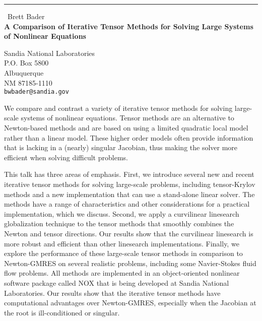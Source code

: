 \documentclass{report}
\begin{document}
\begin{center}
\rule{6in}{1pt} \
{\large Brett Bader \\
{\bf A Comparison of Iterative Tensor Methods for Solving Large Systems of Nonlinear Equations}}

Sandia National Laboratories \\ P.O. Box 5800 \\ Albuquerque \\ NM  87185-1110
\\
{\tt bwbader@sandia.gov}\end{center}

We compare and contrast a variety of iterative tensor methods for solving
large-scale systems of nonlinear equations. Tensor methods are an
alternative to Newton-based methods and are based on using a limited
quadratic local model rather than a linear model. These higher order
models often provide information that is lacking in a (nearly) singular
Jacobian, thus making the solver more efficient when solving difficult
problems.

This talk has three areas of emphasis. First, we introduce several new
and recent iterative tensor methods for solving large-scale problems,
including tensor-Krylov methods and a new implementation that can use a
stand-alone linear solver. The methods have a range of characteristics
and other considerations for a practical implementation, which we
discuss. Second, we apply a curvilinear linesearch globalization
technique to the tensor methods that smoothly combines the Newton and
tensor directions. Our results show that the curvilinear linesearch is
more robust and efficient than other linesearch implementations. Finally,
we explore the performance of these large-scale tensor methods in
comparison to Newton-GMRES on several realistic problems, including some
Navier-Stokes fluid flow problems. All methods are implemented in an
object-oriented nonlinear software package called NOX that is being
developed at Sandia National Laboratories. Our results show that the
iterative tensor methods have computational advantages over Newton-GMRES,
especially when the Jacobian at the root is ill-conditioned or singular.
\end{document}
